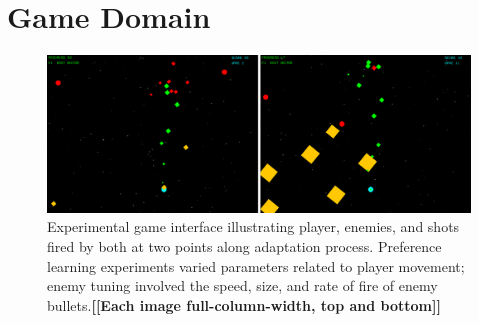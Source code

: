 \documentclass[letterpaper]{article}
\newcommand{\mytodo}[1]{\textbf{[[#1]]}}
\begin{document}






\section{Game Domain}

\begin{figure}[t]
\centering
\includegraphics[width=1\linewidth]{./bullethell_sidebyside}
\caption{Experimental game interface illustrating player, enemies, and shots fired by both at two points along adaptation process. Preference learning experiments varied parameters related to player movement; enemy tuning involved the speed, size, and rate of fire of enemy bullets.\mytodo{Each image full-column-width, top and bottom}}
\label{fig:shmup}
\end{figure}
\end{document}
